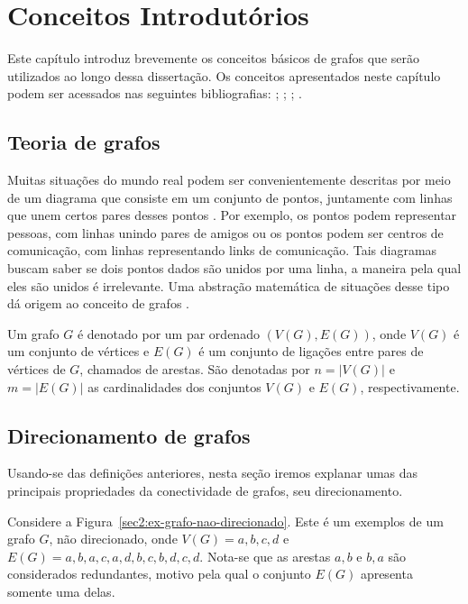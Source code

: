 \graphicspath{{\currfiledir/images/}}

\chapter{Conceitos Introdutórios}


Este capítulo introduz brevemente os conceitos básicos de grafos que serão utilizados ao longo dessa dissertação. Os conceitos apresentados neste capítulo podem ser acessados nas seguintes bibliografias: \cite{bondymurty1976}; \cite{west2002}; \cite{bondymurty2008}; \cite{feofiloff2018}.


\section{Teoria de grafos}
Muitas situações do mundo real podem ser convenientemente descritas por meio de um diagrama que consiste em um conjunto de pontos, juntamente com linhas que unem certos pares desses pontos \cite{bondymurty1976}. Por exemplo, os pontos podem representar pessoas, com linhas unindo pares de amigos ou os pontos podem ser centros de comunicação, com linhas representando links de comunicação. Tais diagramas buscam saber se dois pontos dados são unidos por uma linha, a maneira pela qual eles são unidos é irrelevante. Uma abstração matemática de situações desse tipo dá origem ao conceito de grafos \cite{bondymurty2008}.

\begin{definition}
    Um grafo $G$ é denotado por um par ordenado $(V(G), E(G))$, onde $V(G)$ é um conjunto de vértices e $E(G)$ é um conjunto de ligações entre pares de vértices de $G$, chamados de arestas. São denotadas por $n = |V(G)|$ e $m = |E(G)|$ as cardinalidades dos conjuntos $V(G)$ e $E(G)$, respectivamente.
\end{definition}


\section{Direcionamento de grafos}
Usando-se das definições anteriores, nesta seção iremos explanar umas das principais propriedades da conectividade de grafos, seu direcionamento.

Considere a Figura~\ref{sec2:ex-grafo-nao-direcionado}. Este é um exemplos de um grafo $G$, não direcionado, onde $V(G) = {a, b, c, d}$ e $E(G) = {{a, b}, {a, c}, {a, d}, {b, c}, {b, d}, {c, d}}$. Nota-se que as arestas ${a, b}$ e ${b, a}$ são considerados redundantes, motivo pela qual o conjunto $E(G)$ apresenta somente uma delas.

